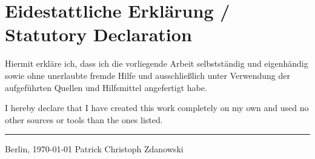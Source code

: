\chapter*{\LARGE Eidestattliche Erklärung / Statutory Declaration}
Hiermit erkläre ich, dass ich die vorliegende Arbeit selbstständig und eigenhändig sowie ohne unerlaubte fremde Hilfe und ausschließlich unter Verwendung der aufgeführten Quellen und Hilfsmittel angefertigt habe.
\vspace{2em}

\noindent I hereby declare that I have created this work completely on my own and used no other sources or tools than the ones listed.

\vspace{30 mm}
\begin{flushright}

\rule{90mm}{1pt}

Berlin, \today \hspace{15 mm} Patrick Christoph Zdanowski
\end{flushright}
